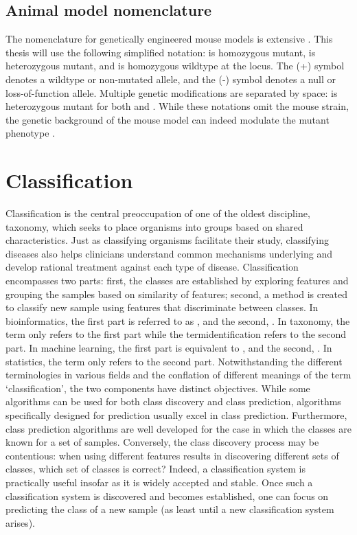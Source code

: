 \subsection{Animal model nomenclature}

The nomenclature for genetically engineered mouse models is extensive . This thesis will use the following simplified notation: \high{-/-} is homozygous mutant, \high{+/-} is heterozygous mutant, and \high{+/+} is homozygous wildtype at the  locus. The (+) symbol denotes a wildtype or non-mutated allele, and the (-) symbol denotes a null or loss-of-function allele. Multiple genetic modifications are separated by space: \high{+/-} \high{+/-} is heterozygous mutant for both  and . While these notations omit the mouse strain, the genetic background of the mouse model can indeed modulate the mutant phenotype .


\section{Classification}
\label{sec:classification}

Classification is the central preoccupation of one of the oldest discipline, taxonomy, which seeks to place organisms into groups based on shared characteristics. Just as classifying organisms facilitate their study, classifying diseases also helps clinicians understand common mechanisms underlying and develop rational treatment against each type of disease. Classification encompasses two parts: first, the classes are established by exploring features and grouping the samples based on similarity of features; second, a method is created to classify new sample using features that discriminate between classes. In bioinformatics, the first part is referred to as , and the second, . In taxonomy, the term  only refers to the first part while the term{identification} refers to the second part. In machine learning, the first part is equivalent to , and the second, . In statistics, the term  only refers to the second part. Notwithstanding the different terminologies in various fields and the conflation of different meanings of the term `classification', the two components have distinct objectives. While some algorithms can be used for both class discovery and class prediction, algorithms specifically designed for prediction usually excel in class prediction. Furthermore, class prediction algorithms are well developed for the case in which the classes are known for a set of samples. Conversely, the class discovery process may be contentious: when using different features results in discovering different sets of classes, which set of classes is correct? Indeed, a classification system is practically useful insofar as it is widely accepted and stable. Once such a classification system is discovered and becomes established, one can focus on predicting the class of a new sample (as least until a new classification system arises).

